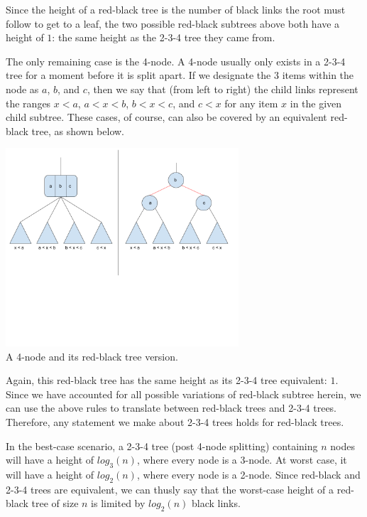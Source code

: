 \documentclass[12pt]{amsart}
\begin{document}
    Since the height of a red-black tree is the number of black
    links the root must follow to get to a leaf, the two
    possible red-black subtrees above both have a height of $1$:
    the same height as the 2-3-4 tree they came from.

    The only remaining case is the 4-node. A 4-node usually only
    exists in a 2-3-4 tree for a moment before it is split
    apart. If we designate the $3$ items within the node as
    $a$, $b$, and $c$, then we say that (from left to right) the
    child links represent the ranges $x < a$, $a < x < b$,
    $b < x < c$, and $c < x$ for any item $x$ in the given
    child subtree. These cases, of course, can also be covered
    by an equivalent red-black tree, as shown below.

\begin{center}
    \includegraphics[width=0.65\textwidth]{rb_tree_2} \\
    A 4-node and its red-black tree version. \\
    \vskip 1cm
\end{center}

    Again, this red-black tree has the same height as its 2-3-4
    tree equivalent: $1$. Since we have accounted for all
    possible variations of red-black subtree herein, we can use
    the above rules to translate between red-black trees and
    2-3-4 trees. Therefore, any statement we make about 2-3-4
    trees holds for red-black trees.

    In the best-case scenario, a 2-3-4 tree (post 4-node
    splitting) containing $n$ nodes will have a height of
    $log_3(n)$, where every node is a 3-node. At worst case, it
    will have a height of $log_2(n)$, where every node is a
    2-node. Since red-black and 2-3-4 trees are equivalent, we
    can thusly say that the worst-case height of a red-black
    tree of size $n$ is limited by $log_2(n)$ black links.
\end{document}
